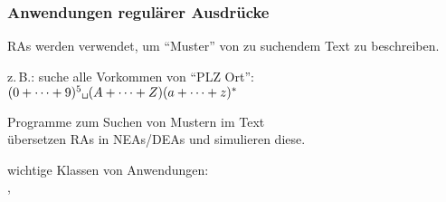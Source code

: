    \begin{frame}
      \frametitle{Anwendungen regulärer Ausdrücke}
      
      \begin{Itemize}
        \item
          RAs werden verwendet, um "`Muster"' von zu suchendem Text zu beschreiben.
          \begin{Itemize}
            \item[]
              z.\,B.: suche alle Vorkommen von "`PLZ Ort"':\\
              $(0+\dots+9)^5\texttt{\textvisiblespace}(A+\dots+Z)(a+\dots+z)^*$
          \end{Itemize}
          \par\medskip
        \item
          Programme zum Suchen von Mustern im Text\\
          übersetzen RAs in NEAs/DEAs und simulieren diese.  
          \par\medskip
        \item
          wichtige Klassen von Anwendungen:\\
          , 
      \end{Itemize}

    \end{frame}

